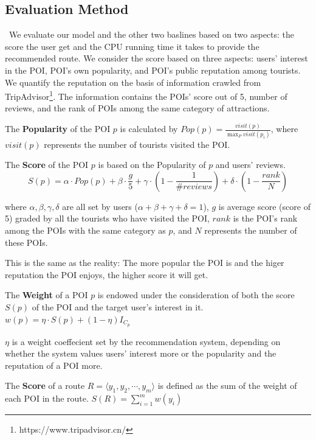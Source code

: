 \documentclass[runningheads]{llncs}
\begin{document}
\subsection{Evaluation Method}
\quad\, We evaluate our model and the other two baslines based on two aspects: the score the user get and the CPU running time it takes to provide the recommended route. We consider the score based on three aspects: users' interest in the POI, POI's own popularity, and POI's public reputation among tourists. We quantify the reputation on the basis of information crawled from TripAdvisor\footnote{https://www.tripadvisor.cn/}. The information contains the POIs' score out of 5, number of reviews, and the rank of POIs among the same category of attractions.
\begin{definition}
	The \textbf{Popularity} of the POI $p$ is calculated by $Pop(p)=\frac{visit(p)}{\max_{P}visit(p_i)}$, where $visit(p)$ represents the number of tourists visited the POI.
\end{definition}
\begin{definition}
	The \textbf{Score} of the POI $p$ is based on the Popularity of $p$ and users' reviews. 
	\begin{equation}
	S(p)=\alpha\cdot Pop(p)+\beta\cdot\frac{g}{5}+\gamma\cdot(1-\frac{1}{\#reviews})+\delta\cdot(1-\frac{rank}{N})
	\end{equation}
	
	where $\alpha,\beta,\gamma,\delta$ are all set by users ($\alpha+\beta+\gamma+\delta=1$), $g$ is average score (score of 5) graded by all the tourists who have visited the POI, $rank$ is the POI's rank among the POIs with the same category as $p$, and $N$ represents the number of these POIs.
\end{definition}

This is the same as the reality: The more popular the POI is and the higer reputation the POI enjoys, the higher score it will get.
\begin{definition}
	The \textbf{Weight} of a POI $p$ is endowed under the consideration of both the score $S(p)$ of the POI and the target user's interest in it. $w(p)=\eta\cdot S(p)+(1-\eta)I_{C_p}$
\end{definition}

$\eta$ is a weight coeffecient set by the recommendation system, depending on whether the system values users' interest more or the popularity and the reputation of a POI more.  
\begin{definition}
	The \textbf{Score} of a route $R=\langle y_1,y_2,\cdots,y_m\rangle$ is defined as the sum of the weight of each POI in the route. $S(R)=\sum_{i=1}^{m}w(y_i)$
\end{definition}
\end{document}
